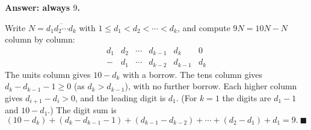 \textbf{Answer: always $\boxed{9}$.}

Write $N=\overline{d_1d_2\cdots d_k}$ with $1\le d_1<d_2<\cdots<d_k$, and compute $9N=10N-N$ column by column:
\[\begin{array}{cccccc}d_1&d_2&\cdots&d_{k-1}&d_k&0\\-&d_1&\cdots&d_{k-2}&d_{k-1}&d_k\end{array}\]
The units column gives $10-d_k$ with a borrow. The tens column gives $d_k-d_{k-1}-1\ge0$ (as $d_k>d_{k-1}$), with no further borrow. Each higher column gives $d_{i+1}-d_i>0$, and the leading digit is $d_1$. (For $k=1$ the digits are $d_1-1$ and $10-d_1$.) The digit sum is
\[(10-d_k)+(d_k-d_{k-1}-1)+(d_{k-1}-d_{k-2})+\cdots+(d_2-d_1)+d_1=9.\ \blacksquare\]
